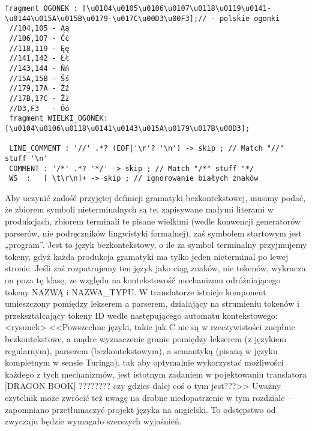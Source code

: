 \begin{lstlisting}[basicstyle=\scriptsize\ttfamily,breaklines=true]
 fragment OGONEK : [\u0104\u0105\u0106\u0107\u0118\u0119\u0141-\u0144\u015A\u015B\u0179-\u017C\u00D3\u00F3];// - polskie ogonki
 //104,105 - Ąą
 //106,107 - Ćć
 //118,119 - Ęę
 //141,142 - Łł
 //143,144 - Ńń
 //15A,15B - Śś
 //179,17A - Źź
 //17B,17C - Żż
 //D3,F3   - Óó
 fragment WIELKI_OGONEK: [\u0104\u0106\u0118\u0141\u0143\u015A\u0179\u017B\u00D3];

 LINE_COMMENT : '//' .*? (EOF|'\r'? '\n') -> skip ; // Match "//" stuff '\n'
 COMMENT : '/*' .*? '*/' -> skip ; // Match "/*" stuff "*/
 WS  :   [ \t\r\n]+ -> skip ; // ignorowanie białych znaków
\end{lstlisting}
\lstset{
    escapechar=|,
    breaklines=true
}
\restoregeometry %

Aby uczynić zadość przyjętej definicji gramatyki bezkontekstowej, musimy podać, że zbiorem symboli nieterminalnych są te, zapisywane małymi literami w produkcjach, zbiorem terminali te pisane wielkimi (wedle konwencji generatorów parserów, nie podręczników lingwistyki formalnej), zaś symbolem startowym jest „program”. 
Jest to język bezkontekstowy, o ile za symbol terminalny przyjmujemy tokeny, gdyż każda produkcja gramatyki ma tylko jeden nieterminal po lewej stronie. Jeśli zaś rozpatrujemy ten język jako ciąg znaków, nie tokenów, wykracza on poza tę klasę, ze względu na kontekstowość mechanizmu odróżniającego tokeny NAZWĄ i NAZWA\_TYPU.
W translatorze istnieje komponent umieszczony pomiędzy lekserem a parserem, działający na strumieniu tokenów i przekształcający tokeny ID wedle następującego automatu kontekstowego:
<rysunek>
<<Powszechne języki, takie jak C nie są w rzeczywistości zuepłnie bezkontekstowe, a mądre wyznaczenie granic pomiędzy lekserem (z językiem regularnym), parserem (bezkontekstowym), a semantyką (pisaną w języku kompletnym w sensie Turinga), tak aby optymalnie wykorzystać możliwości każdego z tych mechanizmów, jest istotnym zadaniem w pojektowaniu translatora [DRAGON BOOK] ???????? czy gdzies dalej coś o tym jest???>>
Uważny czytelnik może zwrócić też uwagę na drobne niedopatrzenie w tym rozdziale – zapomniano  przetłumaczyć projekt języka na angielski. To odstępstwo od zwyczaju będzie wymagało szerszych wyjaśnień.

